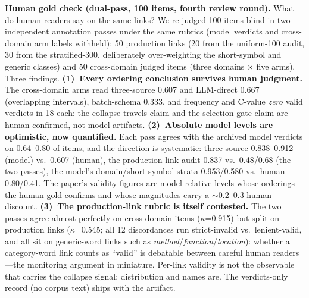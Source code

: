 \documentclass[preprint,12pt]{elsarticle}
\begin{document}
\textbf{Human gold check (dual-pass, 100 items, fourth review round).}
What do human readers say on the same links? We re-judged 100 items
blind in two independent annotation passes under the same rubrics
(model verdicts and cross-domain arm labels withheld): 50 production
links (20 from the uniform-100 audit, 30 from the stratified-300,
deliberately over-weighting the short-symbol and generic classes) and
50 cross-domain judged items (three domains $\times$ five arms). Three
findings. \textbf{(1)~Every ordering conclusion survives human
judgment.} The cross-domain arms read three-source 0.607 and
LLM-direct 0.667 (overlapping intervals), batch-schema 0.333, and
frequency and C-value \emph{zero} valid verdicts in 18 each: the
collapse-travels claim and the selection-gate claim are
human-confirmed, not model artifacts. \textbf{(2)~Absolute model
levels are optimistic, now quantified.} Each pass agrees with the
archived model verdicts on 0.64--0.80 of items, and the direction is
systematic: three-source 0.838--0.912 (model) vs.\ 0.607 (human),
the production-link audit 0.837 vs.\ 0.48/0.68 (the two passes), the
model's domain/short-symbol strata 0.953/0.580 vs.\ human
0.80/0.41. The paper's validity figures are model-relative levels
whose orderings the human gold confirms and whose magnitudes carry a
${\sim}$0.2--0.3 human discount. \textbf{(3)~The production-link
rubric is itself contested.} The two passes agree almost perfectly on
cross-domain items ($\kappa$=0.915) but split on production links
($\kappa$=0.545; all 12 discordances run strict-invalid vs.\
lenient-valid, and all sit on generic-word links such as
\emph{method}/\emph{function}/\emph{location}): whether a
category-word link counts as ``valid'' is debatable between careful
human readers---the monitoring argument in miniature. Per-link
validity is not the observable that carries the collapse signal;
distribution and names are. The verdicts-only record (no corpus text)
ships with the artifact.
\end{document}
